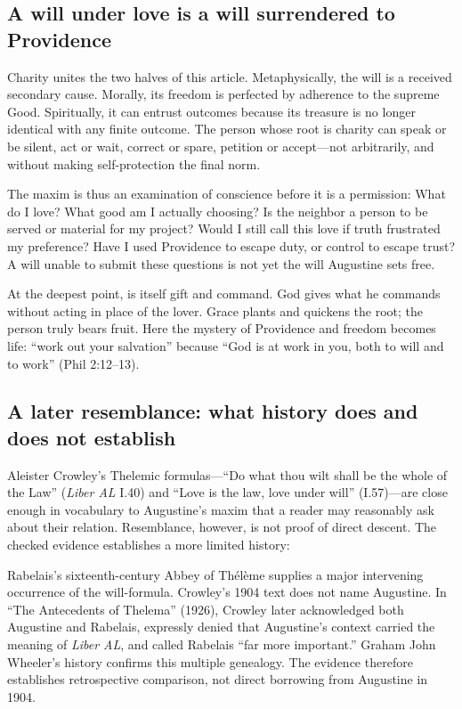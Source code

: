 \subsection{A will under love is a will surrendered to Providence}

Charity unites the two halves of this article. Metaphysically, the will is a received secondary cause. Morally, its freedom is perfected by adherence to the supreme Good. Spiritually, it can entrust outcomes because its treasure is no longer identical with any finite outcome. The person whose root is charity can speak or be silent, act or wait, correct or spare, petition or accept---not arbitrarily, and without making self-protection the final norm.

The maxim is thus an examination of conscience before it is a permission: What do I love? What good am I actually choosing? Is the neighbor a person to be served or material for my project? Would I still call this love if truth frustrated my preference? Have I used Providence to escape duty, or control to escape trust? A will unable to submit these questions is not yet the will Augustine sets free.

At the deepest point,  is itself gift and command. God gives what he commands without acting in place of the lover. Grace plants and quickens the root; the person truly bears fruit. Here the mystery of Providence and freedom becomes life: ``work out your salvation'' because ``God is at work in you, both to will and to work'' (Phil 2:12--13).

\subsection{A later resemblance: what history does and does not establish}

Aleister Crowley's Thelemic formulas---``Do what thou wilt shall be the whole of the Law'' (\emph{Liber AL} I.40) and ``Love is the law, love under will'' (I.57)---are close enough in vocabulary to Augustine's maxim that a reader may reasonably ask about their relation. Resemblance, however, is not proof of direct descent. The checked evidence establishes a more limited history:

Rabelais's sixteenth-century Abbey of Thélème supplies a major intervening
occurrence of the will-formula. Crowley's 1904 text does not name Augustine.
In ``The Antecedents of Thelema'' (1926), Crowley later acknowledged both
Augustine and Rabelais, expressly denied that Augustine's context carried the
meaning of \emph{Liber AL}, and called Rabelais ``far more important.''
Graham John Wheeler's history confirms this multiple genealogy. The evidence
therefore establishes retrospective comparison, not direct borrowing from
Augustine in 1904.

